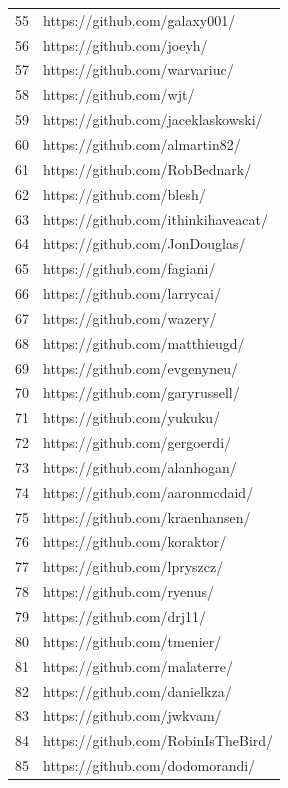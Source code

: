 \begin{center}
\begin{longtable}{|p{2cm}|p{7cm}|}
        55 & https://github.com/galaxy001/ \\
        56 & https://github.com/joeyh/ \\
        57 & https://github.com/warvariuc/ \\
        58 & https://github.com/wjt/ \\
        59 & https://github.com/jaceklaskowski/ \\
        60 & https://github.com/almartin82/ \\
        61 & https://github.com/RobBednark/ \\
        62 & https://github.com/blesh/ \\
        63 & https://github.com/ithinkihaveacat/ \\
        64 & https://github.com/JonDouglas/ \\
        65 & https://github.com/fagiani/ \\
        66 & https://github.com/larrycai/ \\
        67 & https://github.com/wazery/ \\
        68 & https://github.com/matthieugd/ \\
        69 & https://github.com/evgenyneu/ \\
        70 & https://github.com/garyrussell/ \\
        71 & https://github.com/yukuku/ \\
        72 & https://github.com/gergoerdi/ \\
        73 & https://github.com/alanhogan/ \\
        74 & https://github.com/aaronmcdaid/ \\
        75 & https://github.com/kraenhansen/ \\
        76 & https://github.com/koraktor/ \\
        77 & https://github.com/lpryszcz/ \\
        78 & https://github.com/ryenus/ \\
        79 & https://github.com/drj11/ \\
        80 & https://github.com/tmenier/ \\
        81 & https://github.com/malaterre/ \\
        82 & https://github.com/danielkza/ \\
        83 & https://github.com/jwkvam/ \\
        84 & https://github.com/RobinIsTheBird/ \\
        85 & https://github.com/dodomorandi/ \\

\end{longtable}
\end{center}
